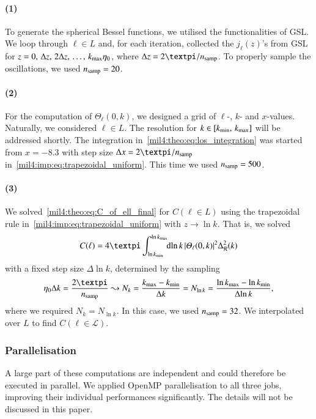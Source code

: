 \paragraph*{(1)}
To generate the spherical Bessel functions, we utilised the functionalities of GSL. We loop through $\ell \in L$ and, for each iteration, collected the $j_\ell(z)$'s from GSL for $z=0,\,\Delta z,\, 2\Delta z,\, \dots,\, k_\mathrm{max}\eta_0$, where $\Delta z = 2\pi/n\ped{samp}$. To properly sample the oscillations, we used $n_\mathrm{samp}=20$. 

\paragraph*{(2)} 
For the computation of $\Theta_\ell(0,k)$, we designed a grid of $\ell$-, $k$- and $x$-values. Naturally, we considered $\ell \in L$. The resolution for $k\in [k_\mathrm{min},\,k_\mathrm{max}]$ will be addressed shortly. The integration in~\cref{mil4:theo:eq:los_integration} was started from $x=-8.3$ with step size $\Delta x= 2\pi/n\ped{samp}$ in~\cref{mil4:imp:eq:trapezoidal_uniform}. This time we used $n_\mathrm{samp}=500$. 

\paragraph*{(3)}
We solved~\cref{mil4:theo:eq:C_of_ell_final} for $C(\ell\in L)$ using the trapezoidal rule in~\cref{mil4:imp:eq:trapezoidal_uniform} with $z\to\ln{k}$. That is, we solved
\begin{equation}
    C(\ell) = 4\pi \int_{\ln{k\ped{min}}}^{\ln{k\ped{max}}} \dx{\ln{k}} \abs{\Theta_\ell(0,k)}^2 \Delta_\mathcal{R}^2(k)
\end{equation}
with a fixed step size $\Delta\!\ln{k}$, determined by the sampling
\begin{equation}
    \eta_0 \Delta k = \frac{2\pi}{n\ped{samp}} \leadsto N_k = \frac{k\ped{max}-k\ped{min}}{\Delta k} = N_{\ln{k}} = \frac{\ln{k\ped{max}}-\ln{k\ped{min}}}{\Delta \!\ln{k}},
\end{equation} 
where we required $N_k=N_{\ln{k}}$.
In this case, we used $n_\mathrm{samp}=32$. We interpolated over $L$ to find $C(\ell \in \mathcal{L})$.



\subsubsection{Parallelisation}
    A large part of these computations are independent and could therefore be executed in parallel. We applied OpenMP parallelisation to all three jobs, improving their individual performances significantly. The details will not be discussed in this paper.